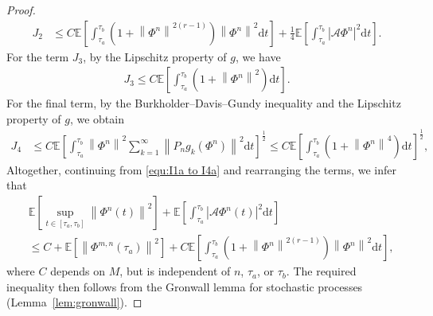 \documentclass[11pt, reqno]{amsart}
\theoremstyle{definition}
\numberwithin{equation}{section}
\newcommand{\bb}{\mathbb}
\newcommand{\dt}{\mathrm{d}t}
\newcommand{\norm}[1]{\left\|{#1}\right\|}
\newcommand{\abs}[1]{\left|{#1}\right|}
\begin{document}
\begin{proof}
\begin{align}
	J_2
	&\leq
	C \bb{E} \left[\int_{\tau_a}^{\tau_b} \left(1+ \norm{\Phi^n}^{2(r-1)} \right) \norm{\Phi^{n}}^2 \dt\right] 
	+ \frac14 \bb{E}\left[ \int_{\tau_a}^{\tau_b}  \abs{\mathcal{A} \Phi^{n}}^2\dt \right].
\end{align}
For the term $J_3$, by the Lipschitz property of $g$, we have
\begin{align*}
	J_3
	\leq
	C\bb{E} \left[\int_{\tau_a}^{\tau_b} \left(1+\norm{\Phi^n}^2\right) \dt\right].
\end{align*}
For the final term, by the Burkholder--Davis--Gundy inequality and the Lipschitz property of $g$, we obtain
\begin{align*}
	J_4
	&\leq
	C \bb{E} \left[ \int_{\tau_a}^{\tau_b} \norm{\Phi^{n}}^2 \sum_{k=1}^\infty \norm{P_n g_k(\Phi^n)}^2 \dt \right]^{\frac12}
	\leq
	C \bb{E}\left[ \int_{\tau_a}^{\tau_b} \left(1+\norm{\Phi^{n}}^4 \right) \dt \right]^{\frac12},
\end{align*}
Altogether, continuing from \eqref{equ:I1a to I4a} and rearranging the terms, we infer that
\begin{align*}
	&\bb{E} \left[ \sup_{t\in [\tau_a,\tau_b]} \norm{\Phi^{n}(t)}^2 \right] 
	+
	\bb{E} \left[ \int_{\tau_a}^{\tau_b} \abs{\mathcal{A}\Phi^{n}(t)}^2 \dt \right]
	\\
	&\leq
	C+ \bb{E}\left[ \norm{\Phi^{m,n}(\tau_a)}^2 \right]
	+ 
	C \bb{E} \left[\int_{\tau_a}^{\tau_b} \left(1+ \norm{\Phi^n}^{2(r-1)} \right) \norm{\Phi^{n}}^2 \dt\right],
\end{align*}
where $C$ depends on $M$, but is independent of $n$, $\tau_a$, or $\tau_b$. The required inequality then follows from the Gronwall lemma for stochastic processes (Lemma~\ref{lem:gronwall}).



\end{proof}
\end{document}
